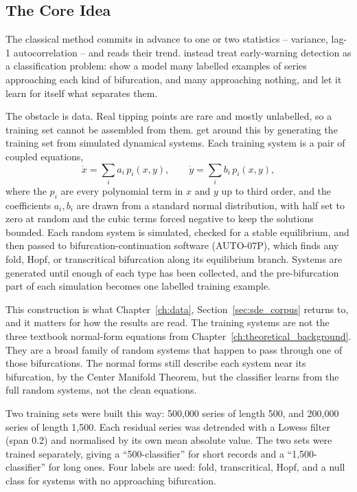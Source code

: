 \subsection{The Core Idea}
The classical method commits in advance to one or two statistics -- variance, lag-1 autocorrelation -- and reads their trend. \citet{bury2021} instead treat early-warning detection as a classification problem: show a model many labelled examples of series approaching each kind of bifurcation, and many approaching nothing, and let it learn for itself what separates them.

The obstacle is data. Real tipping points are rare and mostly unlabelled, so a training set cannot be assembled from them. \citet{bury2021} get around this by generating the training set from simulated dynamical systems. Each training system is a pair of coupled equations,
\[
\dot{x} = \sum_{i} a_i\, p_i(x,y), \qquad \dot{y} = \sum_{i} b_i\, p_i(x,y),
\]
where the $p_i$ are every polynomial term in $x$ and $y$ up to third order, and the coefficients $a_i, b_i$ are drawn from a standard normal distribution, with half set to zero at random and the cubic terms forced negative to keep the solutions bounded. Each random system is simulated, checked for a stable equilibrium, and then passed to bifurcation-continuation software (AUTO-07P), which finds any fold, Hopf, or transcritical bifurcation along its equilibrium branch. Systems are generated until enough of each type has been collected, and the pre-bifurcation part of each simulation becomes one labelled training example.

This construction is what Chapter~\ref{ch:data}, Section~\ref{sec:sde_corpus} returns to, and it matters for how the results are read. The training systems are not the three textbook normal-form equations from Chapter~\ref{ch:theoretical_background}. They are a broad family of random systems that happen to pass through one of those bifurcations. The normal forms still describe each system near its bifurcation, by the Center Manifold Theorem, but the classifier learns from the full random systems, not the clean equations.

Two training sets were built this way: 500{,}000 series of length 500, and 200{,}000 series of length 1{,}500. Each residual series was detrended with a Lowess filter (span 0.2) and normalised by its own mean absolute value. The two sets were trained separately, giving a ``500-classifier'' for short records and a ``1{,}500-classifier'' for long ones. Four labels are used: fold, transcritical, Hopf, and a null class for systems with no approaching bifurcation.

